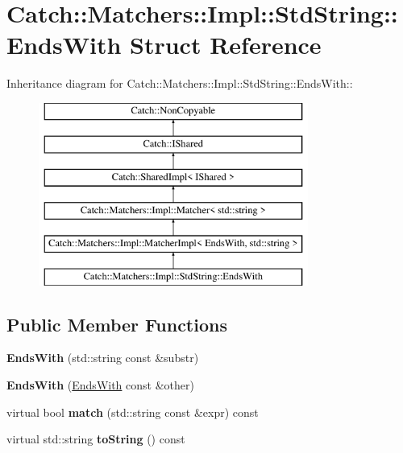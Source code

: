 \hypertarget{structCatch_1_1Matchers_1_1Impl_1_1StdString_1_1EndsWith}{
\section{Catch::Matchers::Impl::StdString::EndsWith Struct Reference}
\label{structCatch_1_1Matchers_1_1Impl_1_1StdString_1_1EndsWith}
}
Inheritance diagram for Catch::Matchers::Impl::StdString::EndsWith::\begin{figure}[H]
\begin{center}
\leavevmode
\includegraphics[height=6cm]{structCatch_1_1Matchers_1_1Impl_1_1StdString_1_1EndsWith}
\end{center}
\end{figure}
\subsection*{Public Member Functions}
\begin{DoxyCompactItemize}
\item 
\hypertarget{structCatch_1_1Matchers_1_1Impl_1_1StdString_1_1EndsWith_a82730175f7f7475ce1ee9791e160d02d}{
{\bfseries EndsWith} (std::string const \&substr)}
\label{structCatch_1_1Matchers_1_1Impl_1_1StdString_1_1EndsWith_a82730175f7f7475ce1ee9791e160d02d}

\item 
\hypertarget{structCatch_1_1Matchers_1_1Impl_1_1StdString_1_1EndsWith_a9321aac07fb17613a7993e99003b3be2}{
{\bfseries EndsWith} (\hyperlink{structCatch_1_1Matchers_1_1Impl_1_1StdString_1_1EndsWith}{EndsWith} const \&other)}
\label{structCatch_1_1Matchers_1_1Impl_1_1StdString_1_1EndsWith_a9321aac07fb17613a7993e99003b3be2}

\item 
\hypertarget{structCatch_1_1Matchers_1_1Impl_1_1StdString_1_1EndsWith_ad0e03d7f54ffa5859f84faebccf11e76}{
virtual bool {\bfseries match} (std::string const \&expr) const }
\label{structCatch_1_1Matchers_1_1Impl_1_1StdString_1_1EndsWith_ad0e03d7f54ffa5859f84faebccf11e76}

\item 
\hypertarget{structCatch_1_1Matchers_1_1Impl_1_1StdString_1_1EndsWith_a54715c94c215a1fc5fb6336acf52eb06}{
virtual std::string {\bfseries toString} () const }
\label{structCatch_1_1Matchers_1_1Impl_1_1StdString_1_1EndsWith_a54715c94c215a1fc5fb6336acf52eb06}

\end{DoxyCompactItemize}

